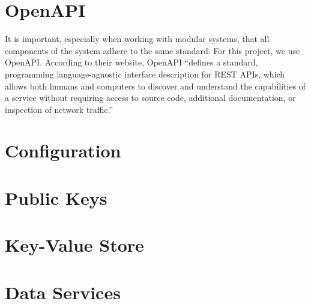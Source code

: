 \section{OpenAPI}

It is important, especially when working with modular systems, that all
components of the system adhere to the same standard. For this project,
we use OpenAPI. According to their website, OpenAPI ``defines a standard,
programming language-agnostic interface description for REST APIs, which allows
both humans and computers to discover and understand the capabilities of a
service without requiring access to source code, additional documentation,
or inspection of network traffic.''\cite{hid-sp18-526-openapi}

\section{Configuration}

\section{Public Keys}

\section{Key-Value Store}

\section{Data Services}





